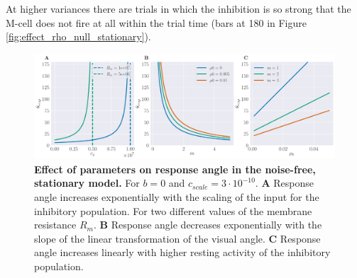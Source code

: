     At higher variances there are trials in which the inhibition is so strong that the M-cell does not fire at all within the trial time (bars at 180\textdegree{} in Figure \ref{fig:effect_rho_null_stationary}).
    \begin{figure}[H]
    	\begin{center}
			\includegraphics[width=\textwidth]{figure_stationary_params.pdf}
    	\end{center}
    	\caption{\textbf{Effect of parameters on response angle in the noise-free, stationary model.}  For $b=0$ and $c_{scale}=3\cdot10^{-10}$. \textbf{A} Response angle increases exponentially with the scaling of the input for the inhibitory population. For two different values of the membrane resistance $R_{m}$. \textbf{B} Response angle decreases exponentially with the slope of the linear transformation of the visual angle. \textbf{C} Response angle increases linearly with higher resting activity of the inhibitory population.}
    	\label{fig:effect_stationary_params}
    \end{figure}
    
